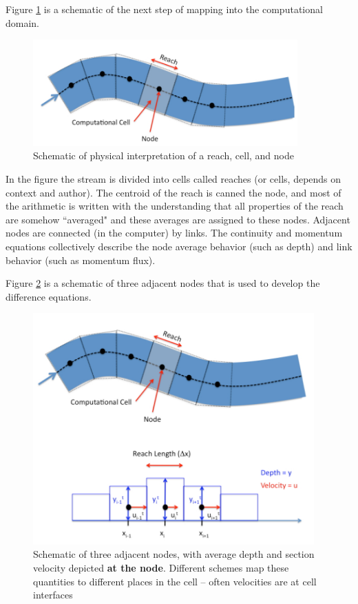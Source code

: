 Figure \ref{fig:stream-discritize} is a schematic of the next step of mapping into the computational domain. 

\begin{figure}[h!] %
   \centering
   \includegraphics[width=4in]{./14-UnsteadyOpenChannel/stream-discritize.jpg} 
   \caption{Schematic of physical interpretation of a reach, cell, and node}
   \label{fig:stream-discritize}
\end{figure}

In the figure the stream is divided into cells called reaches (or cells, depends on context and author).
The centroid of the reach is canned the node, and most of the arithmetic is written with the
understanding that all properties of the reach are somehow ``averaged" and these averages
are assigned to these nodes. 
Adjacent nodes are connected (in the computer) by links.
The continuity and momentum equations collectively describe the node average behavior (such
as depth) and link behavior (such as momentum flux).

Figure \ref{fig:stream-node-scheme} is a schematic of three adjacent nodes that is used to develop the difference equations.

\begin{figure}[h!] %
   \centering
   \includegraphics[width=4.25in]{./14-UnsteadyOpenChannel/stream-node-scheme.jpg} 
   \caption{Schematic of three adjacent nodes, with average depth and section velocity depicted \textbf{at the node}.
   Different schemes map these quantities to different places in the cell -- often velocities are at cell interfaces}
   \label{fig:stream-node-scheme}
\end{figure}

